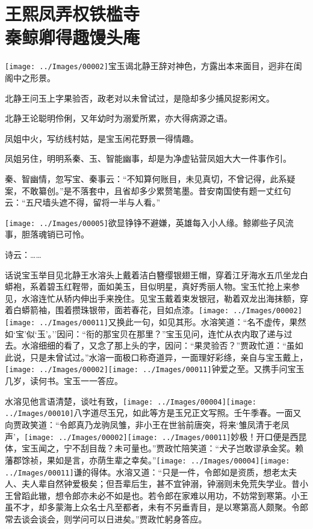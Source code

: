 

\chapter{王熙凤弄权铁槛寺\\秦鲸卿得趣馒头庵}
{\texttt{[image: ../Images/00002]}\kaishu 宝玉谒北静王辞对神色，方露出本来面目，迥非在闺阁中之形景。}

{\kaishu 北静王问玉上字果验否，政老对以未曾试过，是隐却多少捕风捉影闲文。}

{\kaishu 北静王论聪明伶俐，又年幼时为溺爱所累，亦大得病源之语。}

{\kaishu 凤姐中火，写纺线村姑，是宝玉闲花野景一得情趣。}

{\kaishu 凤姐另住，明明系秦、玉、智能幽事，却是为净虚钻营凤姐大大一件事作引。}

{\kaishu 秦、智幽情，忽写宝、秦事云：``不知算何账目，未见真切，不曾记得，此系疑案，不敢纂创。''是不落套中，且省却多少累赘笔墨。昔安南国使有题一丈红句云：``五尺墙头遮不得，留将一半与人看。''}

{\texttt{[image: ../Images/00005]}\kaishu 欲显铮铮不避嫌，英雄每入小人缘。鲸卿些子风流事，胆落魂销已可怜。}

诗云：\ldots{}\ldots{}

话说宝玉举目见北静王水溶头上戴着洁白簪缨银翅王帽，穿着江牙海水五爪坐龙白蟒袍，系着碧玉红鞓带，面如美玉，目似明星，真好秀丽人物。宝玉忙抢上来参见，水溶连忙从轿内伸出手来挽住。见宝玉戴着束发银冠，勒着双龙出海抹额，穿着白蟒箭袖，围着攒珠银带，面若春花，目如点漆。{\texttt{[image: ../Images/00002]}\texttt{[image: ../Images/00011]}\footnotesize \kaishu 又换此一句，如见其形。}水溶笑道：``名不虚传，果然如`宝'似`玉'。''因问：``衔的那宝贝在那里？''宝玉见问，连忙从衣内取了递与过去。水溶细细的看了，又念了那上头的字，因问：``果灵验否？''贾政忙道：``虽如此说，只是未曾试过。''水溶一面极口称奇道异，一面理好彩绦，亲自与宝玉戴上，{\texttt{[image: ../Images/00002]}\texttt{[image: ../Images/00011]}\footnotesize \kaishu 钟爱之至。}又携手问宝玉几岁，读何书。宝玉一一答应。

水溶见他言语清楚，谈吐有致，{\texttt{[image: ../Images/00004]}\texttt{[image: ../Images/00010]}\footnotesize \kaishu 八字道尽玉兄，如此等方是玉兄正文写照。壬午季春。}一面又向贾政笑道：``令郎真乃龙驹凤雏，非小王在世翁前唐突，将来`雏凤清于老凤声'，{\texttt{[image: ../Images/00002]}\texttt{[image: ../Images/00011]}\footnotesize \kaishu 妙极！开口便是西昆体，宝玉闻之，宁不刮目哉？}未可量也。''贾政忙陪笑道：``犬子岂敢谬承金奖。赖藩郡馀祯，果如是言，亦荫生辈之幸矣。''{\texttt{[image: ../Images/00004]}\texttt{[image: ../Images/00011]}\footnotesize \kaishu 谦的得体。}水溶又道：``只是一件，令郎如是资质，想老太夫人、夫人辈自然钟爱极矣；但吾辈后生，甚不宜钟溺，钟溺则未免荒失学业。昔小王曾蹈此辙，想令郎亦未必不如是也。若令郎在家难以用功，不妨常到寒第。小王虽不才，却多蒙海上众名士凡至都者，未有不另垂青目，是以寒第高人颇聚。令郎常去谈会谈会，则学问可以日进矣。''贾政忙躬身答应。

